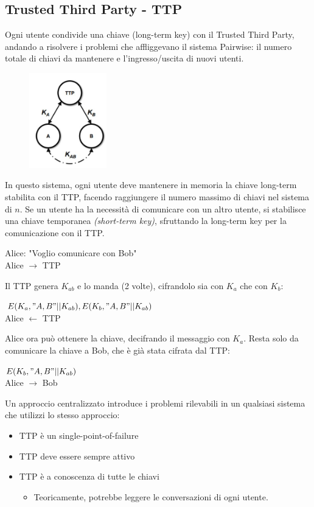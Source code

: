 \documentclass[a4paper,12pt]{article}
\begin{document}
\subsection{Trusted Third Party - TTP}
Ogni utente condivide una chiave (long-term key) con il Trusted Third Party, andando a risolvere i problemi che affliggevano il sistema Pairwise: il numero totale di chiavi da mantenere e l'ingresso/uscita di nuovi utenti.
\begin{figure}[H]
	\centering
	\includegraphics[width=0.3\textwidth]{img/ttp.png}
\end{figure}
In questo sistema, ogni utente deve mantenere in memoria la chiave long-term stabilita con il TTP, facendo raggiungere il numero massimo di chiavi nel sistema di $n$.
Se un utente ha la necessità di comunicare con un altro utente, si stabilisce una chiave temporanea \textit{(short-term key)}, sfruttando la long-term key per la comunicazione con il TTP.
\begin{center}
	Alice: "Voglio comunicare con Bob" \\
	Alice $\rightarrow$ TTP \\
\end{center}
Il TTP genera $K_{ab}$ e lo manda (2 volte), cifrandolo sia con $K_a$ che con $K_b$:
\begin{center}
	$E(K_a,"A,B"||K_{ab}), E(K_b, "A,B"||K_{ab})$ \\
	Alice $\leftarrow$ TTP
\end{center}
Alice ora può ottenere la chiave, decifrando il messaggio con $K_a$. Resta solo da comunicare la chiave a Bob, che è già stata cifrata dal TTP:
\begin{center}
	$E(K_b,"A,B"||K_{ab})$\\
	Alice $\rightarrow$ Bob
\end{center}
Un approccio centralizzato introduce i problemi rilevabili in un qualsiasi sistema che utilizzi lo stesso approccio:
\begin{itemize}
	\item TTP è un single-point-of-failure
	\item TTP deve essere sempre attivo
	\item TTP è a conoscenza di tutte le chiavi
	\begin{itemize}
		\item Teoricamente, potrebbe leggere le conversazioni di ogni utente.
	\end{itemize}
\end{itemize}
\end{document}
